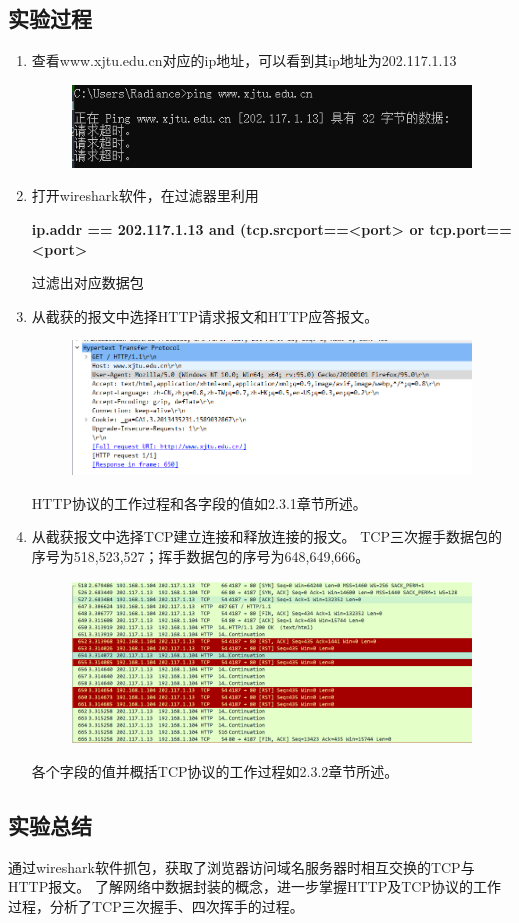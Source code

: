 \documentclass{article}
\begin{document}
\subsection{实验过程}
\begin{enumerate}[(1)]
    \item 查看www.xjtu.edu.cn对应的ip地址，可以看到其ip地址为202.117.1.13
    \begin{figure}[H]
        \centering
        \includegraphics[width=6in]{http0.png}
    \end{figure} 
    \item {打开wireshark软件，在过滤器里利用
    
    \textbf{ip.addr == 202.117.1.13 and (tcp.srcport==<port> or tcp.port==<port>}
    
    过滤出对应数据包}
    \item 从截获的报文中选择HTTP请求报文和HTTP应答报文。
    \begin{figure}[H]
        \centering
        \includegraphics[width=5in]{http2.png}
    \end{figure} 
    HTTP协议的工作过程和各字段的值如2.3.1章节所述。
    
    \item 从截获报文中选择TCP建立连接和释放连接的报文。
    TCP三次握手数据包的序号为518,523,527；挥手数据包的序号为648,649,666。
    \begin{figure}[H]
        \centering
        \includegraphics[width=5in]{http1.png}
    \end{figure}
    
    各个字段的值并概括TCP协议的工作过程如2.3.2章节所述。
\end{enumerate}

\subsection{实验总结}
通过wireshark软件抓包，获取了浏览器访问域名服务器时相互交换的TCP与HTTP报文。
了解网络中数据封装的概念，进一步掌握HTTP及TCP协议的工作过程，分析了TCP三次握手、四次挥手的过程。
\end{document}
